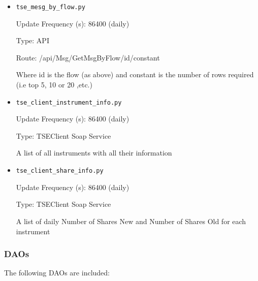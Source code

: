 {\begin{itemize}
 		Type: API

		Route: /api/ClosingPrice/GetTradeTop/MostVisited/1/{constant}

		Where id is the flow (as above) and constant is the number of rows required (i.e top 5, 10 or 20 ,etc.)


   		\item \texttt{tse\_mesg\_by\_flow.py}

   		Update Frequency (s): 86400 (daily)

		Type: API

		Route: /api/Msg/GetMsgByFlow/id/constant

		Where id is the flow (as above) and constant is the number of rows required (i.e top 5, 10 or 20 ,etc.)


   		\item \texttt{tse\_client\_instrument\_info.py}

   		Update Frequency (s): 86400 (daily)

   		Type: TSEClient Soap Service

   		A list of all instruments with all their information

   		\item \texttt{tse\_client\_share\_info.py}

   		Update Frequency (s): 86400 (daily)

   		Type: TSEClient Soap Service

   		A list of daily Number of Shares New and Number of Shares Old for each instrument

	\end{itemize}

	\subsubsection{DAOs}

	The following DAOs are included:

}

